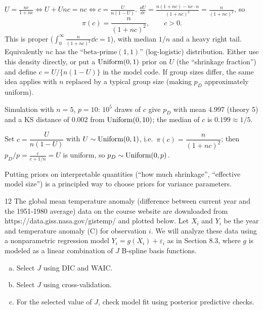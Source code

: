 \documentclass[11pt]{article}
\begin{document}
\solution
{} $U=\frac{nc}{1+nc}\iff U+Unc=nc\iff c=\frac{U}{n(1-U)}$.
 $\frac{\dd U}{\dd c}=\frac{n(1+nc)-nc\cdot n}{(1+nc)^2}=\frac{n}{(1+nc)^2}$, so
\[
\pi(c)=\frac{n}{(1+nc)^2},\qquad c>0.
\]
This is proper ($\int_0^\infty\frac{n}{(1+nc)^2}\dd c=1$), with median $1/n$ and a heavy right tail. Equivalently $nc$ has the ``beta-prime$(1,1)$'' (log-logistic) distribution.
 Either use this density directly, or put a $\mathrm{Uniform}(0,1)$ prior on $U$ (the ``shrinkage fraction'') and define $c=U/\{n(1-U)\}$ in the model code. If group sizes differ, the same idea applies with $n$ replaced by a typical group size (making $p_D$ approximately uniform).

\begin{sanity}
Simulation with $n=5$, $p=10$: $10^5$ draws of $c$ give $p_D$ with mean 4.997 (theory 5) and a KS distance of 0.002 from $\mathrm{Uniform}(0,10)$; the median of $c$ is $0.199\approx1/5$. \checkmark
\end{sanity}

\begin{answer}
Set $c=\dfrac{U}{n(1-U)}$ with $U\sim\mathrm{Uniform}(0,1)$, i.e.\ $\pi(c)=\dfrac{n}{(1+nc)^2}$; then $p_D/p=\frac{c}{c+1/n}=U$ is uniform, so $p_D\sim\mathrm{Uniform}(0,p)$.
\end{answer}

\begin{takeaway}
Putting priors on interpretable quantities (``how much shrinkage'', ``effective model size'') is a principled way to choose priors for variance parameters.
\end{takeaway}


\begin{problem}{12}
The global mean temperature anomaly (difference between current year and the 1951-1980 average) data on the course website are downloaded from https://data.giss.nasa.gov/gistemp/ and plotted below. Let $X_i$ and $Y_i$ be the year and temperature anomaly (C) for observation $i$. We will analyze these data using a nonparametric regression model $Y_i=g(X_i)+\varepsilon_i$ as in Section 8.3, where $g$ is modeled as a linear combination of $J$ B-spline basis functions.
\begin{enumerate}[(a)]
\item Select $J$ using DIC and WAIC.
\item Select $J$ using cross-validation.
\item For the selected value of $J$, check model fit using posterior predictive checks.
\end{enumerate}
\end{problem}
\end{document}
